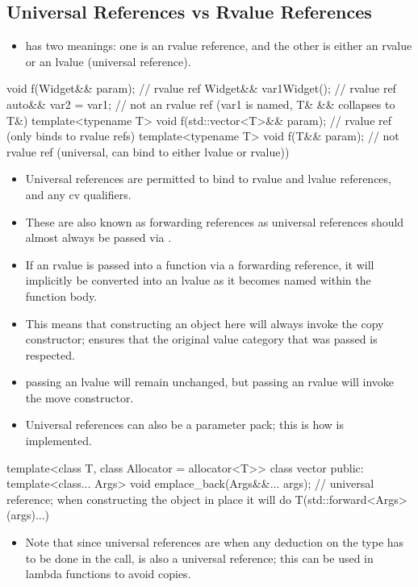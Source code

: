 \subsection{Universal References vs Rvalue References}
\begin{itemize}
  \item {} has two meanings: one is an rvalue reference, and the other is either an rvalue or an lvalue (universal reference). 
\end{itemize}
\begin{cppcode}
void f(Widget&& param); // rvalue ref
Widget&& var1{Widget()}; // rvalue ref
auto&& var2 = var1; // not an rvalue ref (var1 is named, T& && collapses to T&)
template<typename T>
void f(std::vector<T>&& param); // rvalue ref (only binds to rvalue refs)
template<typename T>
void f(T&& param); // not rvalue ref (universal, can bind to either lvalue or rvalue))
\end{cppcode}
\begin{itemize}
  \item Universal references are permitted to bind to rvalue and lvalue references, and any cv qualifiers.
  \item These are also known as forwarding references as universal references should almost always be passed via .
  \item If an rvalue is passed into a function via a forwarding reference, it will implicitly be converted into an lvalue as it becomes named within the function body.
  \item This means that constructing an object here will always invoke the copy constructor;  ensures that the original value category that was passed is respected.
  \item passing an lvalue will remain unchanged, but passing an rvalue will invoke the move constructor.
  \item Universal references can also be a parameter pack; this is how  is implemented.
\end{itemize}
\begin{cppcode}
template<class T, class Allocator = allocator<T>>
class vector {
public:
template<class... Args>
void emplace_back(Args&&... args); // universal reference; when constructing the object in place it will do T(std::forward<Args>(args)...)
}
\end{cppcode}
\begin{itemize}
  \item Note that since universal references are when any deduction on the type has to be done in the call,  is also a universal reference; this can be used in lambda functions to avoid copies.
\end{itemize}
